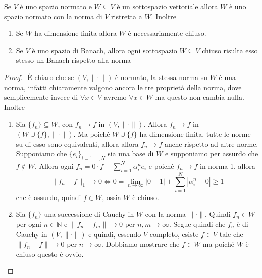 \begin{proposition}
    Se \(V\) è uno spazio normato e \(W \subseteq V \) è un sottospazio
    vettoriale allora \(W\) è uno spazio normato con la norma di \(V\) ristretta
    a \(W\). Inoltre

\begin{enumerate}[label = \alph*.]
    \item Se \(W\) ha dimensione finita allora \(W\) è necessariamente chiuso.
    \item Se \(V\) è uno spazio di Banach, allora ogni sottospazio \(W \subseteq
        V\) chiuso risulta esso stesso un Banach rispetto alla norma
\end{enumerate}
\end{proposition}
\begin{proof} \( \) 
    È chiaro che se \({(V, \|\cdot \|)}\) è normato, la stessa norma su \(W\) è
    una norma, infatti chiaramente valgono ancora le tre proprietà della norma,
    dove semplicemente invece di \(\forall x \in V\) avremo \(\forall x \in W\)
    ma questo non cambia nulla. Inoltre
\begin{enumerate}[label = \alph*.]
    \item Sia \(\{f_{n}\} \subseteq W \), con \(f_{n} \to f\) in \({(V, \|\cdot
        \|)}\). Allora \(f_{n} \to f\) in \({(W \cup \{f\}, \|\cdot \|)}\). Ma
        poiché \(W \cup  \{f\} \) ha dimensione finita, tutte le norme su di
        esso sono equivalenti, allora allora \(f_{n} \to f\)
    anche rispetto ad altre norme. Supponiamo che \({\{e_{i}\}}_{i = 1, \dots, N
    }\) sia una base di \(W\) e supponiamo per assurdo che \(f \not\in W\).
    Allora ogni \(f_{n} = 0\cdot f + \sum_{i=1}^{N} \alpha_{i}^{n} e_{i} \) e poiché
    \(f_{n} \to f\) in norma 1, allora
    \[
        \|f_{n} - f\|_1 \to 0 \iff 0=\lim_{n \to \infty} |0 - 1| + \sum_{i=1}^{N}
        |\alpha_{i}^{n} - 0| \ge  1
    \]
    che è assurdo, quindi \(f \in W\), ossia \(W\) è chiuso.
        
    \item Sia \(\{f_{n}\} \) una successione di Cauchy in \(W\) con la norma
        \(\|\cdot \|\). Quindi \(f_{n} \in W\) per ogni \(n \in \mathbb{N}\) e
        \(\| f_{n} - f_{m}\| \to 0\) per \(n, m\to \infty\). Segue quindi che
        \(f_{n}\) è di Cauchy in \({(V, \| \cdot \|)}\) e quindi, essendo \(V\)
        completo, esiste \(f \in V\) tale che \(\|f_{n} - f\| \to 0\) per \(n
        \to \infty\). Dobbiamo mostrare che \(f \in W\) ma poiché \(W\) è chiuso
        questo è ovvio.
\end{enumerate}

\end{proof}

